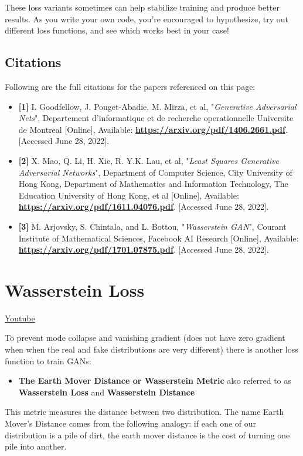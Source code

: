 These loss variants sometimes can help stabilize training and produce better results. As you write your own code, you're encouraged to hypothesize, try out different loss functions, and see which works best in your case!
\subsection{Citations}
Following are the full citations for the papers referenced on this page:

\begin{itemize}
    \item \textbf{[1]} I. Goodfellow, J. Pouget-Abadie, M. Mirza, et al, "\textit{Generative Adversarial Nets}", Departement d’informatique et de recherche operationnelle Universite de Montreal [Online], Available: \href{https://arxiv.org/pdf/1406.2661.pdf}{\textbf{https://arxiv.org/pdf/1406.2661.pdf}}. [Accessed June 28, 2022].
    \item \textbf{[2]} X. Mao, Q. Li, H. Xie, R. Y.K. Lau, et al, "\textit{Least Squares Generative Adversarial Networks}", Department of Computer Science, City University of Hong Kong, Department of Mathematics and Information Technology, The Education University of Hong Kong, et al [Online], Available: \href{https://arxiv.org/pdf/1611.04076.pdf}{\textbf{https://arxiv.org/pdf/1611.04076.pdf}}. [Accessed June 28, 2022].
    \item \textbf{[3]} M. Arjovsky, S. Chintala, and L. Bottou, "\textit{Wasserstein GAN}", Courant Institute of Mathematical Sciences, Facebook AI Research [Online], Available: \href{https://arxiv.org/pdf/1701.07875.pdf}{\textbf{https://arxiv.org/pdf/1701.07875.pdf}}. [Accessed June 28, 2022].
\end{itemize}

\section{Wasserstein Loss}
\href{https://www.youtube.com/watch?v=9LmWLMxNoF0}{Youtube} \newline

To prevent mode collapse and vanishing gradient (does not have zero gradient when when the real and fake distributions are very different) there is another loss function to train GANs: 
\begin{itemize}
    \item \textbf{The Earth Mover Distance or Wasserstein Metric} also referred to as \textbf{Wasserstein Loss} and \textbf{Wasserstein Distance}
\end{itemize}
This metric measures the distance between two distribution. The name Earth Mover's Distance comes from the following analogy: if each one of our distribution is a pile of dirt, the earth mover distance is the cost of turning one pile into another. 

